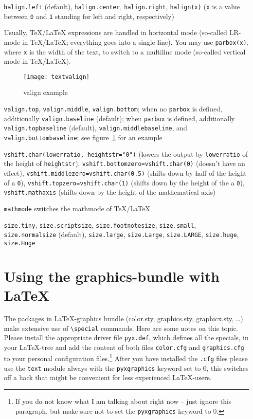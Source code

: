 \begin{description}
\raggedright
\item[Horizontal alignment:] \verb|halign.left| (default),
\verb|halign.center|, \verb|halign.right|, \verb|halign(x)| (\verb|x|
is a value between \verb|0| and \verb|1| standing for left and right,
respectively)
\item[Vertical box:] Usually, \TeX/\LaTeX{} expressions are handled in
horizontal mode (so-called LR-mode in \TeX/\LaTeX; everything goes
into a single line). You may use \verb|parbox(x)|, where \verb|x| is the
width of the text, to switch to a multiline mode (so-called vertical
mode in \TeX/\LaTeX).
\begin{figure}
\centerline{\texttt{[image: textvalign]}}
\caption{valign example}
\label{fig:textvalign}
\end{figure}
\item[Vertical alignment:] \verb|valign.top|, \verb|valign.middle|,
\verb|valign.bottom|; when no \verb|parbox| is defined, additionally
\verb|valign.baseline| (default); when \verb|parbox| is defined,
additionally \verb|valign.topbaseline| (default),
\verb|valign.middlebaseline|, and \verb|valign.bottombaseline|; see
figure~\ref{fig:textvalign} for an example
\item[Vertical shift:] \verb|vshift.char(lowerratio, heightstr="0")|
(lowers the output by \verb|lowerratio| of the height of
\verb|heightstr|), \verb|vshift.bottomzero=vshift.char(0)| (doesn't
have an effect), \verb|vshift.middlezero=vshift.char(0.5)| (shifts
down by half of the height of a \verb|0|),
\verb|vshift.topzero=vshift.char(1)| (shifts down by the height of the a
\verb|0|), \verb|vshift.mathaxis| (shifts down by the height of the
mathematical axis)
\item[Mathmode:] \verb|mathmode| switches the mathmode of \TeX/\LaTeX
\item[Font size:] \verb|size.tiny|, \verb|size.scriptsize|,
\verb|size.footnotesize|, \verb|size.small|, \verb|size.normalsize|
(default), \verb|size.large|, \verb|size.Large|, \verb|size.LARGE|,
\verb|size.huge|, \verb|size.Huge|
\end{description}

\section{Using the graphics-bundle with \LaTeX}

The packages in \LaTeX-graphics bundle (color.sty, graphics.sty,
graphicx.sty, \ldots) make extensive use of \verb|\special| commands. Here
are some notes on this topic. Please install the appropriate driver file
\verb|pyx.def|, which defines all the specials, in your \LaTeX-tree and add
the content of both files \verb|color.cfg| and \verb|graphics.cfg| to your
personal configuration files.\footnote{If you do not know what I am talking about
right now -- just ignore this paragraph, but make sure not to set the
\texttt{pyxgraphics} keyword to 0.} After you have installed the \verb|.cfg|
files please use the \verb|text| module always with the \verb|pyxgraphics|
keyword set to 0, this switches off a hack that might be convenient for less
experienced \LaTeX-users.\medskip

